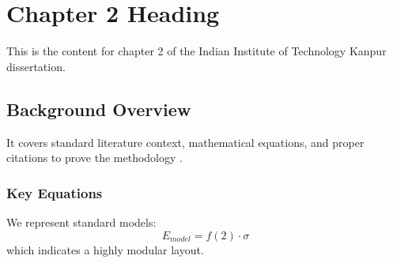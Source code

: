 \chapter{Chapter 2 Heading}
\label{ch:chapter2}
This is the content for chapter 2 of the Indian Institute of Technology Kanpur dissertation.

\section{Background Overview}
It covers standard literature context, mathematical equations, and proper citations to prove the methodology \cite{texbook}.

\subsection{Key Equations}
We represent standard models:
\begin{equation}
    E_{model} = f(2) \cdot \sigma
\end{equation}
which indicates a highly modular layout.
